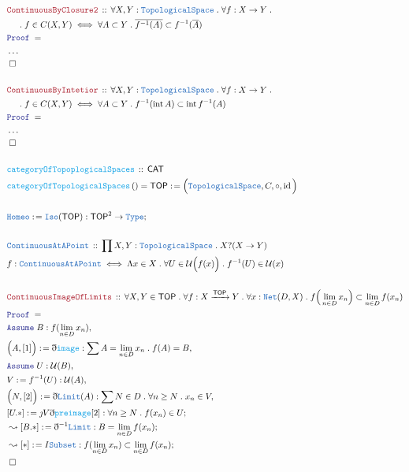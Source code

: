 \documentclass[12pt]{scrartcl}
\newcommand{\TYPE}[1]{\textcolor{NavyBlue}{\mathtt{#1}}}
\newcommand{\FUNC}[1]{\textcolor{Cerulean}{\mathtt{#1}}}
\newcommand{\LOGIC}[1]{\textcolor{Blue}{\mathtt{#1}}}
\newcommand{\THM}[1]{\textcolor{Maroon}{\mathtt{#1}}}
\renewcommand{\.}{\; . \;}
\newcommand{\de}{: \kern 0.1pc =}
\newcommand{\Act}[1]{\left( #1 \right)}
\newcommand{\Theorem}[2]{& \THM{#1} \, :: \, #2 \\ & \Proof = \\ }
\newcommand{\DeclareType}[2]{& \TYPE{#1} \, :: \, #2 \\}
\newcommand{\DefineType}[3]{& #1 : \TYPE{#2} \iff #3 \\}
\newcommand{\DeclareFunc}[2]{& \FUNC{#1} \, :: \, #2 \\}
\newcommand{\DefineNamedFunc}[4]{&  \FUNC{#1}\Act{#2} = #3 \de #4 \\}
\newcommand{\NewLine}{\\ & \kern 1pc}
\newcommand{\Page}[1]{ \begin{align*} #1 \end{align*}   }
\newcommand{ \bd }{ \ByDef }
\newcommand{\NoProof}{ & \ldots \\ \EndProof}
\newcommand{\Type}{\TYPE{Type}}
\DeclareMathOperator*{\id}{id}
\newcommand{\Arrow}{\xrightarrow}
\newcommand{\Say}[3]{& #1 \de #2 : #3, \\}
\newcommand{\Conclude}[3]{& #1 \de #2 : #3; \\}
\newcommand{\DeriveConclude}[3]{& \leadsto #1 \de #2 : #3 ; \\}
\newcommand{\Assume}[2]{& \LOGIC{Assume} \; #1 : #2, \\}
\newcommand{\QED}{\; \square}
\newcommand{\EndProof}{& \QED \\}
\newcommand{\ByDef}{\eth}
\newcommand{\ByConstr}{\jmath}
\newcommand{\Proof}{\LOGIC{Proof} \; }
\newcommand{\CAT}{\mathsf{CAT}}
\newcommand{\TS}{\TYPE{TopologicalSpace}}
\DeclareMathOperator*{\intx}{int}
\newcommand{\TOP}{\mathsf{TOP}}
\renewcommand{\U}{\mathcal{U}}
\begin{document}
\Page{
	\Theorem{ContinuousByClosure2}
	{
		\forall X,Y : \TS \.
		\forall f : X \to Y \.
		\NewLine \.
		f \in C(X,Y) \iff
		\forall A \subset Y \. 
		\overline{f^{-1}(A)} \subset f^{-1}(\overline{A})
	}
	\NoProof
	\\
	\Theorem{ContinuousByIntetior}
	{
		\forall X,Y : \TS \.
		\forall f : X \to Y \.
		\NewLine \.
		f \in C(X,Y) \iff
		\forall A \subset Y \. 
		f^{-1}( \intx A) \subset \intx f^{-1}(A)
	}
	\NoProof
	\\
	\DeclareFunc{categoryOfTopoplogicalSpaces}{\CAT}
	\DefineNamedFunc{categoryOfTopologicalSpaces}
	{  }{\TOP}{\Big( \TS, C,\circ,\id\Big)}
	\\
	\Conclude{\TYPE{Homeo}}{\TYPE{Iso}(\TOP)}{\TOP^2 \to \Type}
	\\
	\DeclareType{ContinuousAtAPoint}
	{ \prod X,Y : \TS \. X  ?(X \to Y) }
	\DefineType{f}{ContinuousAtAPoint}
	{
		\Lambda x \in X \. \forall U \in \U\Big(f(x)\Big) \.
		f^{-1}(U) \in \U(x)
	}
	\\
	\Theorem{ContinuousImageOfLimits}
	{
		\forall X,Y \in \TOP \.
		\forall f : X \Arrow{\TOP} Y \.
		\forall x : \TYPE{Net}(D,X) \.
		f\Big( \lim_{n \in D}  x_n\Big) \subset
		\lim_{n \in D } f(x_n)
	}
	\Assume{B}{f(\lim_{n \in D} x_n)}
	\Say{\Big(A,[1]\Big)}{\bd \FUNC{image}}
	{
		\sum A = \lim_{n \in D} x_n\. f(A) = B
	}
	\Assume{U}{\U(B)}
	\Say{V}{f^{-1}(U)}{\U(A)}
	\Say{\Big(N,[2]\Big)}
	{
		\bd \TYPE{Limit}(A)
	}
	{
		\sum N \in D \. \forall n \ge N \. x_n \in V
	}
	\Conclude{[U.*]}{\ByConstr V \bd \FUNC{preimage}[2]}
	{
		\forall n \ge N \. f(x_n) \in U
	}
	\DeriveConclude{[B.*]}{\bd^{-1}\TYPE{Limit}}
	{
		B = \lim_{n \in D} f(x_n)
	}
	\DeriveConclude{[*]}{I\TYPE{Subset}}
	{
		f(\lim_{n \in D} x_n) \subset \lim_{n \in D} f(x_n)
	}
	\EndProof
}
\end{document}
